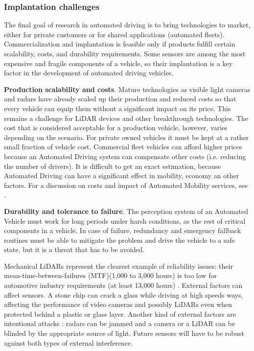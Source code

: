 

\subsubsection{Implantation challenges}

The final goal of research in automated driving is to bring technologies to
market, either for private customers or for shared applications (automated 
fleets). Commercialization and implantation is feasible only if products 
fulfill certain scalability, costs, and durability requirements. 
Some sensors are among the most expensive and fragile components of a vehicle,
so their implantation is a key factor in the development of automated driving
vehicles.

\textbf{Production scalability and costs}. 
Mature technologies as visible light cameras and radars have already scaled up 
their production and reduced costs so that every vehicle can equip them without
a significant impact on its price. This remains a challenge for LiDAR devices
and other breakthrough technologies.
The cost that is considered acceptable for a production vehicle, however, 
varies depending on the scenario. For private owned vehicles it must be kept at 
a rather small fraction of vehicle cost. Commercial fleet vehicles can afford 
higher prices because an Automated Driving system can compensate other costs 
(i.e. reducing the number of drivers).
It is difficult to get an exact estimation, because Automated Driving can 
have a significant effect in mobility, economy an other factors. 
For a discussion on costs and impact of Automated Mobility services, see
\cite{Bosch2018}.

\textbf{Durability and tolerance to failure}.
The perception system of an Automated Vehicle must work for long
periods under harsh conditions, as the rest of critical components in a vehicle.
In case of failure, redundancy and emergency fallback routines must be able to 
mitigate the problem and drive the vehicle to a safe state, but it is a 
threat that has to be avoided.

Mechanical LiDARs represent the clearest example of reliability issues: their 
mean-time-between-failures (MTF)(1,000 to 3,000 hours) is too low for 
automotive industry requirements (at least 13,000 hours) \cite{Hampstead2018}.
External factors can affect sensors. A stone chip can crack a glass while 
driving at high speeds ways, affecting the performance of video cameras and 
possibly LiDARs even when protected behind a plastic or glass layer. 
Another kind of external factors are intentional attacks \cite{Petit2015a}: 
radars can be jammed and a camera or a LiDAR can be blinded by the appropriate
source of light.
Future sensors will have to be robust against both types of external 
interference.

